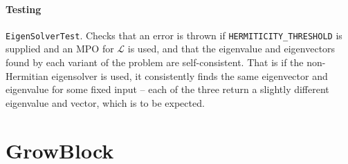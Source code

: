  \paragraph{Testing} \lstinline$EigenSolverTest$. Checks that an error is thrown if \lstinline$HERMITICITY_THRESHOLD$ is supplied and an MPO for \(\mathcal{L}\) is used, and that the eigenvalue and eigenvectors found by each variant of the problem are self-consistent. That is if the non-Hermitian eigensolver is used, it consistently finds the same eigenvector and eigenvalue for some fixed input -- each of the three return a slightly different eigenvalue and vector, which is to be expected.

 \section{GrowBlock}
